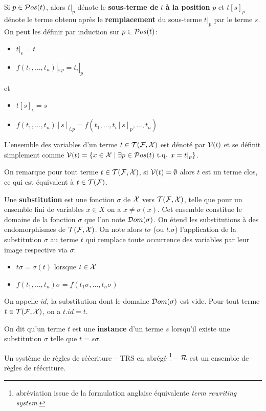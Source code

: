 Si $p \in \mathcal{ P}os(t)$, alors $t|_p$ dénote le \textbf{sous-terme de} $t$ \textbf{à la position} $p$ et
$t[s]_p$ dénote le terme obtenu après le \textbf{remplacement} du sous-terme $t|_p$ par le terme $s$.
On peut les définir par induction sur $p \in \mathcal{ P}os(t)$:
\begin{itemize}
\item $t|_\epsilon = t$
\item $f(t_1,\dots, t_n)|_{i.p} = t_i|_p$
\end{itemize}
et
\begin{itemize}
\item $t[s]_\epsilon = s$
\item $f(t_1,\dots, t_n)[s]_{i.p} = f(t_1,\dots, t_i[s]_p,\dots,t_n)$
\end{itemize}

\begin{definition}
  L'ensemble des variables d'un terme $t \in \mathcal{T(F, X)}$ est dénoté par $\mathcal V(t)$ et se définit simplement
  comme $\mathcal V(t) = \{ x \in \mathcal X \; | \; \exists p \in \mathcal{ P}os(t) \mbox{ t.q. } x = t|_p\}$.
\end{definition}
On remarque pour tout terme $t \in \mathcal{T(F, X)}$, si $\mathcal V(t) = \emptyset$ alors $t$ est un terme clos, ce qui est équivalent à $t \in \mathcal{T(F)}$.

\begin{definition}
  Une \textbf{substitution} est une fonction $\sigma$ de $\mathcal X$ vers $\mathcal{T(F, X)}$, telle que 
  pour un ensemble fini de variables $x \in X$ on a $x \not= \sigma(x)$. Cet
  ensemble constitue le domaine de la fonction $\sigma$ que l'on note $\mathcal{D}om(\sigma)$.
  On étend les substitutions à des endomorphismes de $\mathcal{T(F, X)}$. 
  On note alors $t\sigma$ (ou $t.\sigma$) l'application de la substitution $\sigma$ au terme $t$ 
  qui remplace toute occurrence des variables par leur image respective via $\sigma$:
  \begin{itemize}
  \item $t\sigma = \sigma(t)$ lorsque $t \in \mathcal X$
  \item $f(t_1, \dots, t_n)\sigma = f(t_1\sigma, \dots, t_n\sigma)$
  \end{itemize}
\end{definition}
On appelle $id$, la substitution dont le domaine $\mathcal{D}om(\sigma)$ est vide.
Pour tout terme $t \in \mathcal{T(F, X)}$, on a $t.id = t$.

On dit qu'un terme $t$ est une \textbf{instance} d'un terme $s$ lorsqu'il existe une substitution
$\sigma$ telle que $t = s\sigma$.

Un système de règles de réécriture -- TRS en abrégé
\footnote{\footnotesize abréviation issue de la formulation anglaise équivalente {\em term rewriting system}.} -- 
$\mathcal R$ est un ensemble de règles de réécriture. 

